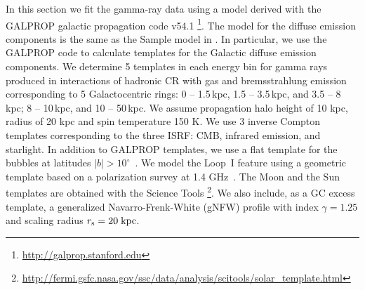In this section we fit the gamma-ray data using a model derived with the GALPROP
galactic propagation code v54.1
\citep{Moskalenko:1997gh, Strong:1998fr, Strong:2004de, Ptuskin:2005ax, 2007ARNPS..57..285S, Porter:2008ve,Vladimirov:2010aq}\footnote{\url{http://galprop.stanford.edu}}. 
The model for the diffuse emission components is the same as the Sample model in \cite{2017ApJ...840...43A}.
In particular, we use the GALPROP code to calculate templates for the Galactic diffuse emission components.
We determine 5 templates in each energy bin for gamma rays produced in 
interactions of hadronic CR with gas and bremsstrahlung emission corresponding to 5 Galactocentric rings: 
0 -- 1.5\,kpc, 1.5 -- 3.5\,kpc, and 3.5 -- 8\,kpc; 8 -- 10\,kpc, and 10 -- 50\,kpc.
We assume propagation halo height of 10 kpc, radius of 20 kpc and spin temperature 150 K.
We use 3 inverse Compton templates corresponding to the three ISRF: CMB, 
infrared emission, and starlight.
In addition to GALPROP templates, we use a flat template for the \Fermi bubbles at latitudes $|b| > 10^\circ$~\citep{2014ApJ...793...64A}. 
We model the Loop~I feature using a geometric template \citep[e.g., Figure 2 of][]{2014ApJ...793...64A}
based on a polarization survey at 1.4 GHz~\citep{Wolleben:2007pq}.
The Moon and the Sun \citep{2007Ap&SS.309..359O, 2006ApJ...652L..65M, 2008A&A...480..847O, 2013arXiv1307.0197J} templates 
are obtained with the \Fermi Science Tools%
\footnote{\url{http://fermi.gsfc.nasa.gov/ssc/data/analysis/scitools/solar_template.html}}.
We also include, as a GC excess template, a generalized Navarro-Frenk-White (gNFW) profile with index $\gamma = 1.25$ 
\citep{Goodenough:2009gk,Calore:2014xka,Abazajian:2014fta}
and scaling radius $r_{\rm s} = 20\;{\rm kpc}$.


